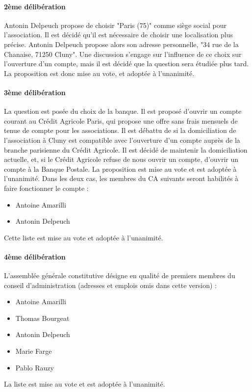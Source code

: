 \documentclass[a4paper]{article}
\begin{document}
\paragraph{2ème délibération} Antonin Delpeuch propose de choisir "Paris (75)" comme siège social pour l'association. Il est décidé qu'il est nécessaire de choisir une localisation plus précise. Antonin Delpeuch propose alors son adresse personnelle, "34 rue de la Chanaise, 71250 Cluny". Une discussion s'engage sur l'influence de ce choix sur l'ouverture d'un compte, mais il est décidé que la question sera étudiée plus tard. La proposition est donc mise au vote, et adoptée à l'unanimité.

\paragraph{3ème délibération} La question est posée du choix de la banque. Il est proposé d'ouvrir un compte courant au Crédit Agricole Paris, qui propose une offre sans frais mensuels de tenue de compte pour les associations. Il est débattu de si la domiciliation de l'association à Cluny est compatible avec l'ouverture d'un compte auprès de la branche parisienne du Crédit Agricole. Il est décidé de maintenir la domiciliation actuelle, et, si le Crédit Agricole refuse de nous ouvrir un compte, d'ouvrir un compte à la Banque Postale. La proposition est mise au vote et est adoptée à l'unanimité. Dans les deux cas, les membres du CA suivants seront habilités à faire fonctionner le compte :
\begin{itemize}
  \item Antoine Amarilli
  \item Antonin Delpeuch
\end{itemize}
Cette liste est mise au vote et adoptée à l'unanimité.

\paragraph{4ème délibération} L'assemblée générale constitutive désigne en qualité de premiers membres du conseil d'administration (adresses et emplois omis dans cette version) :
\begin{itemize}
  \item Antoine Amarilli
  \item Thomas Bourgeat
  \item Antonin Delpeuch
  \item Marie Farge
  \item Pablo Rauzy

\end{itemize}
La liste est mise au vote et est adoptée à l'unanimité.
\end{document}
